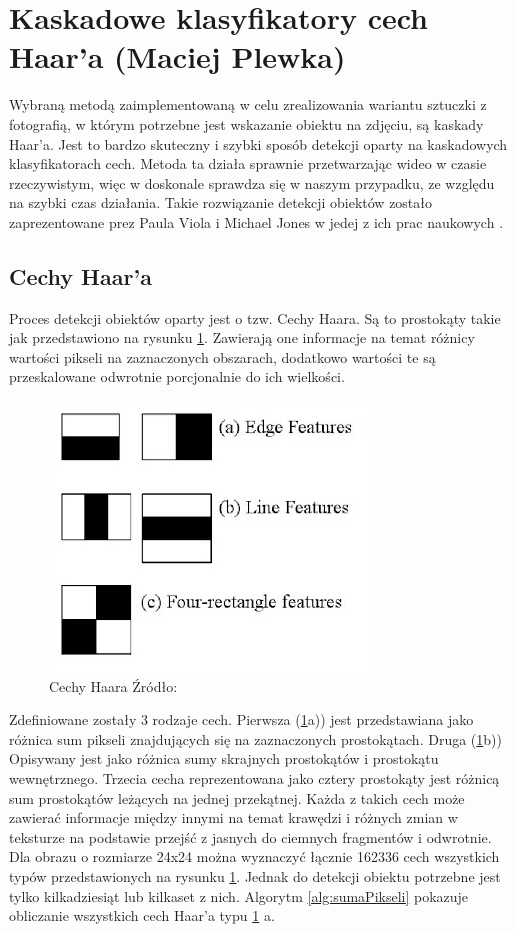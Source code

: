 \section{Kaskadowe klasyfikatory cech Haar'a (Maciej Plewka)}

Wybraną metodą zaimplementowaną w celu zrealizowania wariantu sztuczki z fotografią, w którym potrzebne jest wskazanie obiektu na zdjęciu, są kaskady Haar'a. Jest to bardzo skuteczny i szybki sposób detekcji oparty na kaskadowych klasyfikatorach cech. Metoda ta działa sprawnie przetwarzając wideo w czasie rzeczywistym, więc w doskonale sprawdza się w naszym przypadku, ze względu na szybki czas działania. Takie rozwiązanie detekcji obiektów zostało zaprezentowane prez Paula Viola i Michael Jones w jedej z ich prac naukowych \cite{violaJones}.

\subsection{Cechy Haar'a}
Proces detekcji obiektów oparty jest o tzw. Cechy Haara. Są to prostokąty takie jak przedstawiono na rysunku \ref{fig:cechyHaara}. Zawierają one informacje na temat różnicy wartości pikseli na zaznaczonych obszarach, dodatkowo wartości te są przeskalowane odwrotnie porcjonalnie do ich wielkości.
\begin{figure}[H]
\centering
\includegraphics[scale=0.5]{imgs/cechy.jpg}
\caption{{Cechy Haara Źródło:} \cite{faceDetectionOpenCV}}
\label{fig:cechyHaara}
\end{figure}

Zdefiniowane zostały 3 rodzaje cech. Pierwsza (\ref{fig:cechyHaara}a)) jest przedstawiana jako różnica sum pikseli znajdujących się na zaznaczonych prostokątach. Druga (\ref{fig:cechyHaara}b))  Opisywany jest jako różnica sumy skrajnych prostokątów i prostokątu wewnętrznego. Trzecia cecha reprezentowana jako cztery prostokąty jest różnicą sum prostokątów leżących na jednej przekątnej. Każda z takich cech może zawierać informacje między innymi na temat krawędzi i różnych zmian w teksturze na podstawie przejść z jasnych do ciemnych fragmentów i odwrotnie. Dla obrazu o rozmiarze 24x24 można wyznaczyć łącznie 162336 cech wszystkich typów przedstawionych na rysunku \ref{fig:cechyHaara}. Jednak do detekcji obiektu potrzebne jest tylko kilkadziesiąt lub kilkaset z nich. Algorytm \ref{alg:sumaPikseli} pokazuje obliczanie wszystkich cech Haar'a typu \ref{fig:cechyHaara} a.

